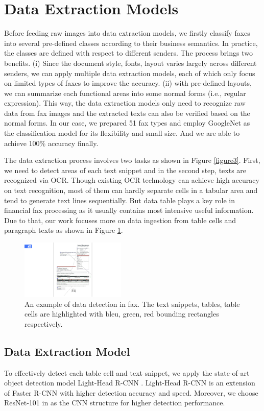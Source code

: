 \documentclass[sigconf]{acmart}
\begin{document}
\section{Data Extraction Models}
Before feeding raw images into data extraction models, we firstly classify faxes into several pre-defined classes according to their business semantics. In practice, the classes are defined with respect to different senders. The process brings two benefits. (i) Since the document style, fonts, layout varies largely across different senders, we can apply multiple data extraction models, each of which only focus on limited types of faxes to improve the accuracy. (ii) with pre-defined layouts, we can summarize each functional areas into some normal forms (i.e., regular expression). This way, the data extraction models only need to recognize raw data from fax images and the extracted texts can also be verified based on the normal forms. In our case, we prepared 51 fax types and employ GoogleNet \cite{szegedy2015going} as the classification model for its flexibility and small size. And we are able to achieve 100\% accuracy finally.

The data extraction process involves two tasks as shown in Figure \ref{figure3}. First, we need to detect areas of each text snippet and in the second step, texts are recognized via OCR. Though existing OCR technology can achieve high accuracy on text recognition, most of them can hardly separate cells in a tabular area and tend to generate text lines sequentially. But data table plays a key role in financial fax processing as it usually contains most intensive useful information. Due to that, our work focuses more on data ingestion from table cells and paragraph texts as shown in Figure \ref{figure5}.


\begin{figure}[h]
	\centering
	\includegraphics[width=5cm]{figure5}
	\caption{An example of data detection in fax. The text snippets, tables, table cells are highlighted with bleu, green, red bounding rectangles respectively. }
	\label{figure5}
\end{figure}

\subsection{Data Extraction Model}
To effectively detect each table cell and text snippet, we apply the state-of-art object detection model Light-Head R-CNN \cite{li2017light}. Light-Head R-CNN is an extension of Faster R-CNN with higher detection accuracy and speed. Moreover, we choose ResNet-101 in \cite{he2016deep} as the CNN structure for higher detection performance.
\end{document}
